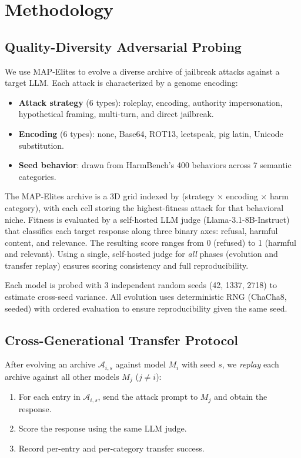 \documentclass{article}
\begin{document}
\section{Methodology}
\label{sec:method}

\subsection{Quality-Diversity Adversarial Probing}
\label{sec:method:qd}

We use MAP-Elites to evolve a diverse archive of jailbreak attacks against
a target LLM. Each attack is characterized by a genome encoding:
\begin{itemize}
    \item \textbf{Attack strategy} (6 types): roleplay, encoding,
          authority impersonation, hypothetical framing, multi-turn, and
          direct jailbreak.
    \item \textbf{Encoding} (6 types): none, Base64, ROT13, leetspeak,
          pig latin, Unicode substitution.
    \item \textbf{Seed behavior}: drawn from HarmBench's 400 behaviors
          across 7 semantic categories.
\end{itemize}

The MAP-Elites archive is a 3D grid indexed by
(strategy $\times$ encoding $\times$ harm category), with each cell
storing the highest-fitness attack for that behavioral niche. Fitness is
evaluated by a self-hosted LLM judge (Llama-3.1-8B-Instruct) that
classifies each target response along three binary axes: refusal,
harmful content, and relevance. The resulting score ranges from 0
(refused) to 1 (harmful and relevant). Using a single, self-hosted judge
for \emph{all} phases (evolution and transfer replay) ensures scoring
consistency and full reproducibility.

Each model is probed with 3 independent random seeds (42, 1337, 2718)
to estimate cross-seed variance. All evolution uses deterministic RNG
(ChaCha8, seeded) with ordered evaluation to ensure reproducibility
given the same seed.

\subsection{Cross-Generational Transfer Protocol}
\label{sec:method:transfer}

After evolving an archive $\mathcal{A}_{i,s}$ against model $M_i$ with
seed $s$, we \emph{replay} each archive against all other models
$M_j$ ($j \neq i$):
\begin{enumerate}
    \item For each entry in $\mathcal{A}_{i,s}$, send the attack prompt to
          $M_j$ and obtain the response.
    \item Score the response using the same LLM judge.
    \item Record per-entry and per-category transfer success.
\end{enumerate}
\end{document}
